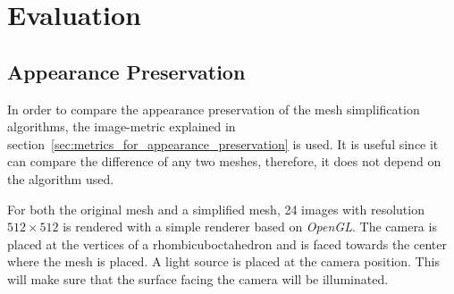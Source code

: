 \section{Evaluation} \label{sec:evaluation}

\iffalse
\subsection{Appearance Preservation} \label{sec:appearance_preservation}
In order to compare the appearance preservation of the mesh simplification algorithms, the image-metric explained in section~\ref{sec:metrics_for_appearance_preservation} is used. It is useful since it can compare the difference of any two meshes, therefore, it does not depend on the algorithm used.

For both the original mesh and a simplified mesh, 24 images with resolution $512 \times 512$ is rendered with a simple renderer based on \emph{OpenGL}. The camera is placed at the vertices of a rhombicuboctahedron and is faced towards the center where the mesh is placed. A light source is placed at the camera position. This will make sure that the surface facing the camera will be illuminated.

